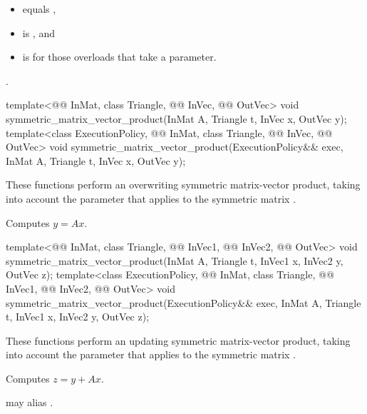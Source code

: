 \pnum
\expects
\begin{itemize}
\item
{} equals ,
\item
{} is , and
\item
{} is 
for those overloads that take a  parameter.
\end{itemize}

\pnum
\complexity
{}.

\begin{itemdecl}
template<@@ InMat, class Triangle, @@ InVec, @@ OutVec>
  void symmetric_matrix_vector_product(InMat A, Triangle t, InVec x, OutVec y);
template<class ExecutionPolicy,
         @@ InMat, class Triangle, @@ InVec, @@ OutVec>
  void symmetric_matrix_vector_product(ExecutionPolicy&& exec,
                                       InMat A, Triangle t, InVec x, OutVec y);
\end{itemdecl}

\begin{itemdescr}

\pnum
These functions perform an overwriting symmetric matrix-vector product,
taking into account the  parameter
that applies to the symmetric matrix .

\pnum
\effects
Computes $y = A x$.
\end{itemdescr}

\begin{itemdecl}
template<@@ InMat, class Triangle, @@ InVec1, @@ InVec2, @@ OutVec>
  void symmetric_matrix_vector_product(InMat A, Triangle t, InVec1 x, InVec2 y, OutVec z);
template<class ExecutionPolicy,
         @@ InMat, class Triangle, @@ InVec1, @@ InVec2, @@ OutVec>
  void symmetric_matrix_vector_product(ExecutionPolicy&& exec,
                                       InMat A, Triangle t, InVec1 x, InVec2 y, OutVec z);
\end{itemdecl}

\begin{itemdescr}
\pnum
These functions perform an updating symmetric matrix-vector product,
taking into account the  parameter
that applies to the symmetric matrix .

\pnum
\effects
Computes $z = y + A x$.

\pnum
\remarks
{} may alias .
\end{itemdescr}


